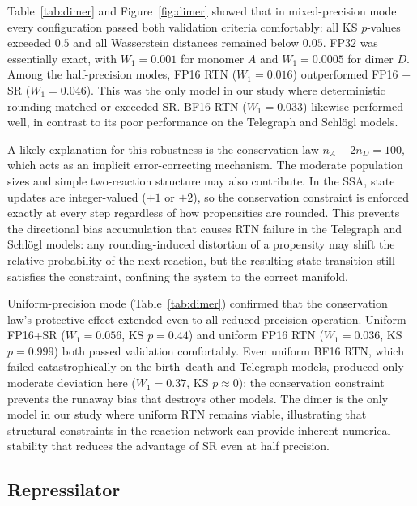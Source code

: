 \documentclass{article}
\begin{document}
Table~\ref{tab:dimer} and Figure~\ref{fig:dimer} showed that in mixed-precision mode every configuration passed both validation criteria comfortably: all KS $p$-values exceeded $0.5$ and all Wasserstein distances remained below $0.05$. FP32 was essentially exact, with $W_1 = 0.001$ for monomer $A$ and $W_1 = 0.0005$ for dimer $D$. Among the half-precision modes, FP16 RTN ($W_1 = 0.016$) outperformed FP16 + SR ($W_1 = 0.046$). This was the only model in our study where deterministic rounding matched or exceeded SR. BF16 RTN ($W_1 = 0.033$) likewise performed well, in contrast to its poor performance on the Telegraph and Schl\"{o}gl models.

A likely explanation for this robustness is the conservation law $n_A + 2n_D = 100$, which acts as an implicit error-correcting mechanism. The moderate population sizes and simple two-reaction structure may also contribute. In the SSA, state updates are integer-valued ($\pm 1$ or $\pm 2$), so the conservation constraint is enforced exactly at every step regardless of how propensities are rounded. This prevents the directional bias accumulation that causes RTN failure in the Telegraph and Schl\"{o}gl models: any rounding-induced distortion of a propensity may shift the relative probability of the next reaction, but the resulting state transition still satisfies the constraint, confining the system to the correct manifold.

Uniform-precision mode (Table~\ref{tab:dimer}) confirmed that the conservation law's protective effect extended even to all-reduced-precision operation. Uniform FP16+SR ($W_1 = 0.056$, KS $p = 0.44$) and uniform FP16 RTN ($W_1 = 0.036$, KS $p = 0.999$) both passed validation comfortably. Even uniform BF16 RTN, which failed catastrophically on the birth--death and Telegraph models, produced only moderate deviation here ($W_1 = 0.37$, KS $p \approx 0$); the conservation constraint prevents the runaway bias that destroys other models. The dimer is the only model in our study where uniform RTN remains viable, illustrating that structural constraints in the reaction network can provide inherent numerical stability that reduces the advantage of SR even at half precision.


\subsection{Repressilator}
\label{sec:repressilator}
\end{document}
